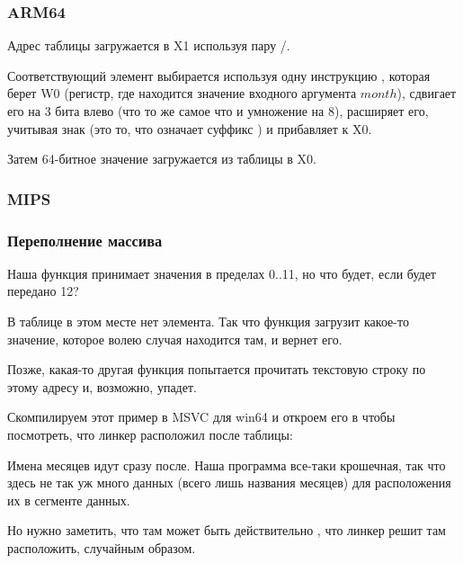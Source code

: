 \subsubsection{ARM64}



Адрес таблицы загружается в X1 используя пару \ADRP/\ADD.

Соответствующий элемент выбирается используя одну инструкцию \LDR, которая берет W0
(регистр, где находится значение входного аргумента $month$), сдвигает его на 3 бита влево
(что то же самое что и умножение на 8),
расширяет его, учитывая знак (это то, что означает суффикс ) и прибавляет к X0.

Затем 64-битное значение загружается из таблицы в X0.

\subsubsection{MIPS}



\subsubsection{Переполнение массива}

Наша функция принимает значения в пределах 0..11, но что будет, если будет передано 12?

В таблице в этом месте нет элемента.
Так что функция загрузит какое-то значение, которое волею случая находится там, и вернет его.

Позже, какая-то другая функция попытается прочитать текстовую строку по этому адресу и, возможно, упадет.

Скомпилируем этот пример в MSVC для win64 и откроем его в \IDA чтобы посмотреть, что линкер расположил
после таблицы:



Имена месяцев идут сразу после.
Наша программа все-таки крошечная,
так что здесь не так уж много данных (всего лишь названия месяцев) для расположения их в сегменте данных.

Но нужно заметить, что там может быть действительно , что линкер решит там расположить, случайным образом.%

